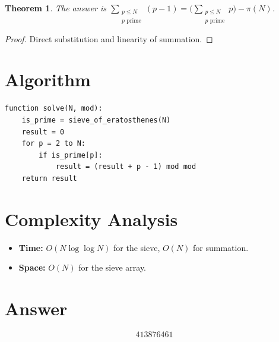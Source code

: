 \documentclass[11pt]{article}
\newtheorem{theorem}{Theorem}
\begin{document}
\begin{theorem}
The answer is $\displaystyle\sum_{\substack{p \le N \\ p \text{ prime}}} (p-1) = \biggl(\sum_{\substack{p \le N \\ p \text{ prime}}} p\biggr) - \pi(N)$.
\end{theorem}

\begin{proof}
Direct substitution and linearity of summation.
\end{proof}

\section{Algorithm}

\begin{verbatim}
function solve(N, mod):
    is_prime = sieve_of_eratosthenes(N)
    result = 0
    for p = 2 to N:
        if is_prime[p]:
            result = (result + p - 1) mod mod
    return result
\end{verbatim}

\section{Complexity Analysis}

\begin{itemize}
    \item \textbf{Time:} $O(N \log\log N)$ for the sieve, $O(N)$ for summation.
    \item \textbf{Space:} $O(N)$ for the sieve array.
\end{itemize}

\section{Answer}

\[
\boxed{413876461}
\]
\end{document}
